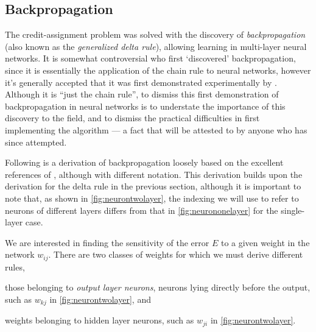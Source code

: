 \documentclass[thesis]{subfiles}
\begin{document}
\subsection{Backpropagation}
The credit-assignment problem was solved with the discovery of \emph{backpropagation} (also known as the \emph{generalized delta rule}), allowing learning in multi-layer neural networks. It is somewhat controversial who first `discovered' backpropagation, since it is essentially the application of the chain rule to neural networks, however it's generally accepted that it was first demonstrated experimentally by \citet{rumelhartbackprop}. Although it is ``just the chain rule'', to dismiss this first demonstration of backpropagation in neural networks is to understate the importance of this discovery to the field, and to dismiss the practical difficulties in first implementing the algorithm --- a fact that will be attested to by anyone who has since attempted.

Following is a derivation of backpropagation loosely based on the excellent references of \citet{haykin1994neural,Bishop1995}, although with different notation. This derivation builds upon the derivation for the delta rule in the previous section, although it is important to note that, as shown in \cref{fig:neurontwolayer}, the indexing we will use to refer to neurons of different layers differs from that in \cref{fig:neurononelayer} for the single-layer case.

We are interested in finding the sensitivity of the error $E$ to a given weight in the network $w_{ij}$. There are two classes of weights for which we must derive different rules, 
\begin{enumerate*}[label= (\textbf{\roman*})]
  \item\label{enum:outputneuron} those belonging to \emph{output layer neurons}, \ie{}neurons lying directly before the output, such as $w_{kj}$ in \cref{fig:neurontwolayer}, and
  \item\label{enum:hiddenneuron} weights belonging to hidden layer neurons, such as $w_{ji}$ in \cref{fig:neurontwolayer}.
\end{enumerate*}
%
\end{document}
